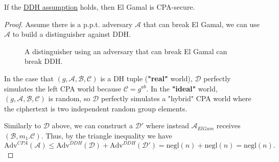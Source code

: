 \begin{theorem}
  If the \hyperref[ddh]{DDH assumption} holds, then El Gamal is CPA-secure.
\end{theorem}
\begin{proof}
  Assume there is a p.p.t. adversary \(\mathcal{A} \) that can break El Gamal, we can use \(\mathcal{A} \) to build a distinguisher against DDH.

  \begin{figure}[H]
    \centering
    \caption{A distinguisher using an adversary that can break El Gamal can break DDH.}
    \label{fig:ddhelgam}
  \end{figure}

  In the case that \((g, \mathcal{A}, \mathcal{B}, \mathcal{C})\) is a DH tuple (\textbf{"real"} world), \(\mathcal{D} \) perfectly simulates the left CPA world because \(\mathcal{C} = g^{ab}\). In the \textbf{"ideal"} world, \((g, \mathcal{A}, \mathcal{B}, \mathcal{C})\) is random, so \(\mathcal{D} \) perfectly simulates a "hybrid" CPA world where the ciphertext is two independent random group elements. \par
  Similarly to \(\mathcal{D} \) above, we can construct a \(\mathcal{D}'\) where instead \(\mathcal{A}_{ElGam}\) receives \((\mathcal{B}, m_1 . \mathcal{C})\). Thus, by the triangle inequality we have
  \[
    \mathrm{Adv}^{CPA}(\mathcal{A}) \leq \mathrm{Adv}^{DDH}(\mathcal{D}) + \mathrm{Adv}^{DDH}(\mathcal{D}') = \mathrm{negl} (n) + \mathrm{negl} (n) = \mathrm{negl} (n).
  \]
\end{proof}